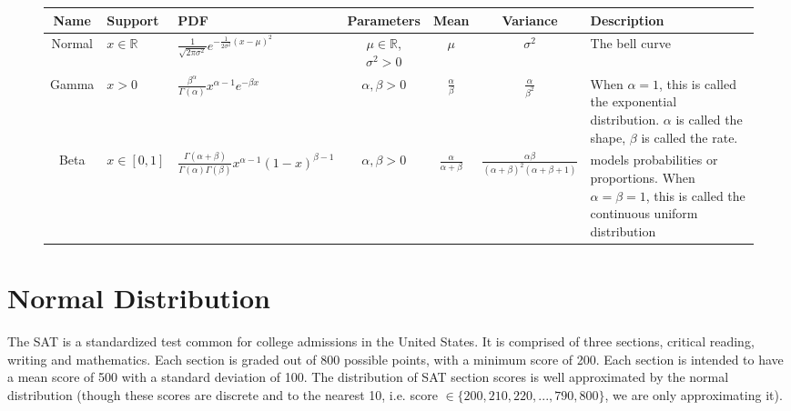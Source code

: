 \begin{figure}[h]
\begin{center}
\begin{tabular}{|c|l|l|c|c|c|l|}
	\hline
Name & Support &  PDF & Parameters & Mean & Variance & Description\\
\hline \hline
Normal  & $x \in \mathbb{R}$ &$\frac{1}{\sqrt{2\pi \sigma^2}} e^{-\frac{1}{2\sigma^2}(x-\mu)^2}$ & $\mu \in \mathbb{R}$, $\sigma^2 > 0$ & $\mu$ & $\sigma^2$ & The bell curve\\ \hline
Gamma  & $x>0$ &$\frac{\beta^\alpha}{\Gamma(\alpha)} x^{\alpha -1} e^{-\beta x}$ & $\alpha,\beta>0$ & $\frac{\alpha}{\beta}$ & $\frac{\alpha}{\beta^2}$ & When $\alpha=1$, this is called the exponential distribution. $\alpha$ is called the shape, $\beta$ is called the rate.\\ \hline
Beta  & $x \in [0,1]$ & $\frac{\Gamma(\alpha+\beta)}{\Gamma(\alpha)\Gamma(\beta)} x^{\alpha-1} (1-x)^{\beta-1}$ & $\alpha,\beta>0$ & $\frac{\alpha}{\alpha + \beta}$ & $\frac{\alpha \beta}{(\alpha + \beta)^2(\alpha + \beta +1)}$ & models probabilities or proportions. When $\alpha = \beta =1$, this is called the continuous uniform distribution\\ 
\hline
\end{tabular}
\end{center}
\end{figure}

\section*{Normal Distribution}
The SAT is a standardized test common for college admissions in the United States. 
It is comprised of three sections, critical reading, writing and mathematics. 
Each section is graded out of 800 possible points, with a minimum score of 200.
Each section is intended to have a mean score of 500 with a standard deviation of 100.  
The distribution of SAT section scores is well approximated by the normal distribution 
(though these scores are discrete and to the nearest 10, i.e. score $\in \{200,210,220,...,790,800\}$, we are only approximating it). 


